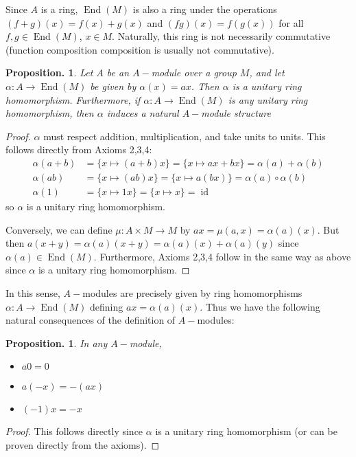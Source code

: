 \documentclass[11pt, a4paper]{memoir}
\theoremstyle{change}
\newtheorem{proposition}[theorem]{Proposition.}
\theoremstyle{plain}
\theoremstyle{nonumberplain}
\newtheorem{proof}{Proof}
\DeclareMathOperator{\End}{End}
\DeclareMathOperator{\id}{id}
\numberwithin{equation}{section}
\begin{document}
Since $A$ is a ring, $\End(M)$ is also a ring under the operations $(f+g)(x)=f(x)+g(x)$ and $(fg)(x)=f(g(x))$ for all $f,g\in\End(M)$, $x\in M$.
Naturally, this ring is not necessarily commutative (function composition composition is usually not commutative).
\begin{proposition}
    Let $A$ be an $A-$module over a group $M$, and let $\alpha:A\to\End(M)$ be given by $\alpha(x)=ax$.
    Then $\alpha$ is a unitary ring homomorphism.
    Furthermore, if $\alpha:A\to\End(M)$ is any unitary ring homomorphism, then $\alpha$ induces a natural $A-$module structure
\end{proposition}
\begin{proof}
    $\alpha$ must respect addition, multiplication, and take units to units.
    This follows directly from Axioms 2,3,4:
    \begin{align*}
        \alpha(a+b)&=\{x\mapsto(a+b)x\}=\{x\mapsto ax+bx\}=\alpha(a)+\alpha(b)\\
        \alpha(ab) &= \{x\mapsto (ab)x\}=\{x\mapsto a(bx)\}=\alpha(a)\circ\alpha(b)\\
        \alpha(1) &= \{x\mapsto 1x\}=\{x\mapsto x\}=\id
    \end{align*}
    so $\alpha$ is a unitary ring homomorphism.

    Conversely, we can define $\mu:A\times M\to M$ by $ax=\mu(a,x)=\alpha(a)(x)$.
    But then $a(x+y)=\alpha(a)(x+y)=\alpha(a)(x)+\alpha(a)(y)$ since $\alpha(a)\in\End(M)$.
    Furthermore, Axioms 2,3,4 follow in the same way as above since $\alpha$ is a unitary ring homomorphism.
\end{proof}
In this sense, $A-$modules are precisely given by ring homomorphisms $\alpha:A\to\End(M)$ defining $ax=\alpha(a)(x)$.
Thus we have the following natural consequences of the definition of $A-$modules:
\begin{proposition}
    In any $A-$module,
    \begin{itemize}[nolistsep]
        \item $a0=0$
        \item $a(-x)=-(ax)$
        \item $(-1)x=-x$
    \end{itemize}
\end{proposition}
\begin{proof}
    This follows directly since $\alpha$ is a unitary ring homomorphism (or can be proven directly from the axioms).
\end{proof}
\end{document}
